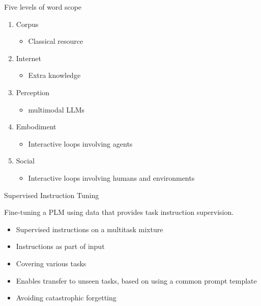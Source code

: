 \begin{vbframe}{Five levels of word scope}

\vfill

\begin{enumerate}

    \item Corpus
        \begin{itemize}
        \item Classical resource
        \end{itemize}

    \item Internet 
        \begin{itemize}
        \item Extra knowledge
        \end{itemize}

    \item Perception 
        \begin{itemize}
        \item multimodal LLMs
        \end{itemize}

    \item Embodiment 
        \begin{itemize}
        \item Interactive loops involving agents
        \end{itemize}

    \item Social 
        \begin{itemize}
        \item Interactive loops involving humans and environments
        \end{itemize}

\end{enumerate}

\vfill

\end{vbframe}


\begin{vbframe}{Supervised Instruction Tuning}

\vfill

Fine-tuning a PLM using data that provides task instruction supervision. \vskip3mm
\begin{itemize}
\item Supervised instructions on a multitask mixture
\item Instructions as part of input
\item Covering various tasks 
\item Enables transfer to unseen tasks, based on using a
common prompt template
\item Avoiding catastrophic forgetting
\end{itemize}

\vfill

\end{vbframe}

